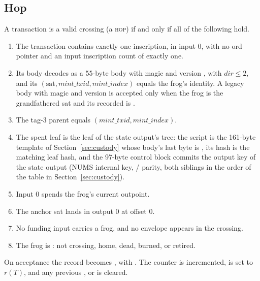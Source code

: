 \subsection{Hop}

A transaction is a valid crossing (a \textsc{hop}) if and only if all of the
following hold.

\begin{enumerate}[leftmargin=1.7em,itemsep=0.25em]
  \item The transaction contains exactly one inscription, in input 0, with
        no ord pointer and an input inscription count of exactly one.
  \item Its body decodes as a 55-byte body with magic 
        and version , with $\mathit{dir}\le2$, and its
        $(\mathrm{sat},\mathit{mint\_txid},\mathit{mint\_index})$ equals the
        frog's identity. A legacy body with magic  and
        version  is accepted only when the frog is the
        grandfathered sat and its recorded  is
        .
  \item The tag-3 parent equals $(\mathit{mint\_txid},\mathit{mint\_index})$.
  \item The spent leaf is the  leaf of the state output's tree: the
        script is the 161-byte template of Section~\ref{sec:custody} whose
        body's last byte is , its hash is the matching leaf hash,
        and the 97-byte control block commits the output key of the state
        output (NUMS internal key, / parity, both
        siblings in the order of the table in Section~\ref{sec:custody}).
  \item Input 0 spends the frog's current outpoint.
  \item The anchor sat lands in output 0 at offset 0.
  \item No funding input carries a frog, and no  envelope appears
        in the crossing.
  \item The frog is : not crossing, home, dead, burned, or
        retired.
\end{enumerate}

On acceptance the record becomes , with
. The counter
 is incremented,  is set to
$r(T)$, and any previous ,  or
 is cleared.

